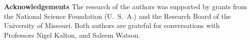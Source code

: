 





{\bf Acknowledgements}  The research of the authors was supported by grants from the National Science Foundation (U.\ S.\ A.) and the Research Board of the University of Missouri.  Both authors are grateful for conversations with Professors Nigel Kalton, and Saleem Watson.

